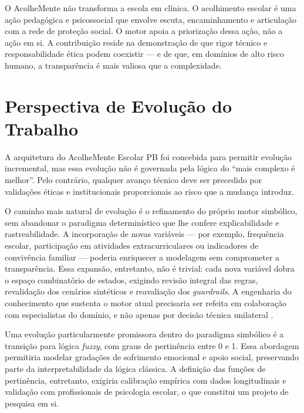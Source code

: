 \documentclass[
    12pt,
    openright,
    oneside,
    a4paper,
    english,
    brazil
]{abntex2}
\begin{document}
O AcolheMente n\~ao transforma a escola em cl\'inica. O acolhimento escolar \'e uma a\c{c}\~ao pedag\'ogica e psicossocial que envolve escuta, encaminhamento e articula\c{c}\~ao com a rede de prote\c{c}\~ao social. O motor apoia a prioriza\c{c}\~ao dessa a\c{c}\~ao, n\~ao a a\c{c}\~ao em si. A contribui\c{c}\~ao reside na demonstra\c{c}\~ao de que rigor t\'ecnico e responsabilidade \'etica podem coexistir --- e de que, em dom\'inios de alto risco humano, a transpar\^encia \'e mais valiosa que a complexidade.

\chapter{Perspectiva de Evolu\c{c}\~ao do Trabalho}

A arquitetura do AcolheMente Escolar PB foi concebida para permitir evolu\c{c}\~ao incremental, mas essa evolu\c{c}\~ao n\~ao \'e governada pela l\'ogica do ``mais complexo \'e melhor''. Pelo contr\'ario, qualquer avan\c{c}o t\'ecnico deve ser precedido por valida\c{c}\~oes \'eticas e institucionais proporcionais ao risco que a mudan\c{c}a introduz.

O caminho mais natural de evolu\c{c}\~ao \'e o refinamento do pr\'oprio motor simb\'olico, sem abandonar o paradigma determin\'istico que lhe confere explicabilidade e rastreabilidade. A incorpora\c{c}\~ao de novas vari\'aveis --- por exemplo, frequ\^encia escolar, participa\c{c}\~ao em atividades extracurriculares ou indicadores de conviv\^encia familiar --- poderia enriquecer a modelagem sem comprometer a transpar\^encia. Essa expans\~ao, entretanto, n\~ao \'e trivial: cada nova vari\'avel dobra o espa\c{c}o combinat\'orio de estados, exigindo revis\~ao integral das regras, revalida\c{c}\~ao dos cen\'arios sint\'eticos e reavalia\c{c}\~ao dos \textit{guardrails}. A engenharia do conhecimento que sustenta o motor atual precisaria ser refeita em colabora\c{c}\~ao com especialistas do dom\'inio, e n\~ao apenas por decis\~ao t\'ecnica unilateral \cite{russell_norvig_2022}.

Uma evolu\c{c}\~ao particularmente promissora dentro do paradigma simb\'olico \'e a transi\c{c}\~ao para l\'ogica \textit{fuzzy}, com graus de pertin\^encia entre 0 e 1. Essa abordagem permitiria modelar grada\c{c}\~oes de sofrimento emocional e apoio social, preservando parte da interpretabilidade da l\'ogica cl\'assica. A defini\c{c}\~ao das fun\c{c}\~oes de pertin\^encia, entretanto, exigiria calibra\c{c}\~ao emp\'irica com dados longitudinais e valida\c{c}\~ao com profissionais de psicologia escolar, o que constitui um projeto de pesquisa em si.
\end{document}
